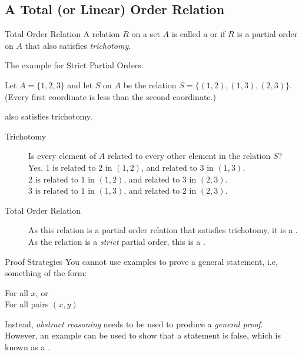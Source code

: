 \documentclass[\main/notes.tex]{subfiles}
\begin{document}
			\subsection{A Total (or Linear) Order Relation}
				\begin{definition}{Total Order Relation}
					A relation $R$ on a set $A$ is called a  or  if $R$ is a partial order on $A$ that also satisfies \emph{trichotomy}.
				\end{definition}
				\begin{example}
					The example for Strict Partial Orders:
					\begin{indentparagraph}
						Let $A = \{1, 2, 3\}$ and let $S$ on $A$ be the relation $S = \bigl\{(1, 2), (1, 3), (2, 3)\bigr\}$. (Every first coordinate is less than the second coordinate.)
					\end{indentparagraph}
					also satisfies trichotomy.
					\begin{description}
						\item[Trichotomy] Is every element of $A$ related to every other element in the relation $S$?\\
							Yes. $1$ is related to $2$ in $(1, 2)$, and related to $3$ in $(1, 3)$.\\
							$2$ is related to $1$ in $(1, 2)$, and related to $3$ in $(2, 3)$.\\
							$3$ is related to $1$ in $(1, 3)$, and related to $2$ in $(2, 3)$.
						\item[Total Order Relation] As this relation is a partial order relation that satisfies trichotomy, it is a . As the relation is a \emph{strict} partial order, this is a .
					\end{description}
				\end{example}
				\begin{sidenote}{Proof Strategies}
					You cannot use examples to prove a general statement, i.e, something of the form:
						\begin{indentparagraph}
							For all $x$, or\\
							For all pairs $(x, y)$
						\end{indentparagraph}
					Instead, \emph{abstract reasoning} needs to be used to produce a \emph{general proof}.\\
					However, an example can be used to show that a statement is false, which is known as a .
				\end{sidenote}
\end{document}
